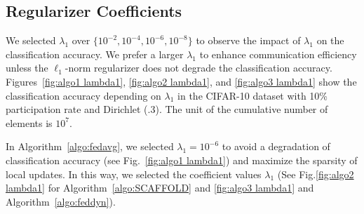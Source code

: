 \documentclass{article} %
\begin{document}
\subsection{Regularizer Coefficients}

We selected $\lambda_{1}$ over $\{10^{-2}, 10^{-4}, 10^{-6}, 10^{-8} \}$ to observe the impact of $\lambda_1$ on the classification accuracy. We prefer a larger $\lambda_1$ to enhance communication efficiency unless the $\ell_1$-norm regularizer does not degrade the classification accuracy. Figures~\ref{fig:algo1 lambda1}, \ref{fig:algo2 lambda1}, and \ref{fig:algo3 lambda1} show the classification accuracy depending on $\lambda_{1}$ in the CIFAR-10 dataset with 10\% participation rate and Dirichlet (.3). The unit of the cumulative number of elements is $10^{7}$.

In Algorithm~\ref{algo:fedavg}, we selected $\lambda_1 = 10^{-6}$ to avoid a degradation of classification accuracy (see Fig.~\ref{fig:algo1 lambda1}) and maximize the sparsity of local updates. In this way, we selected the coefficient values $\lambda_1$ (See Fig.\ref{fig:algo2 lambda1} for Algorithm~\ref{algo:SCAFFOLD} and \ref{fig:algo3 lambda1} and Algorithm~\ref{algo:feddyn}).
\end{document}
